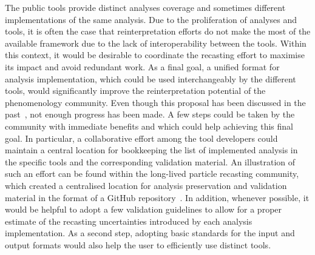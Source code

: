 \documentclass[11pt]{article}
\begin{document}
The public tools provide distinct analyses coverage and sometimes different implementations of the same analysis.
Due to the proliferation of analyses and tools, it is often the case that reinterpretation efforts do not make the most of the available framework due to the lack of interoperability between the tools.
Within this context, it would be desirable to coordinate the \gls{recasting} effort to maximise its impact and avoid redundant work. 
As a final goal, a unified format for analysis implementation, which could be used interchangeably by the different tools, would significantly improve the reinterpretation potential of the phenomenology community.
Even though this proposal has been discussed in the past~\cite{lukas_heinrich_2017_6362700}, not enough progress has been made.
A few steps could be taken by the community with immediate benefits and which could help achieving this final goal.
In particular, a collaborative effort among the tool developers could maintain a central location for bookkeeping the list of implemented analysis in the specific tools and the corresponding validation material.
An illustration of such an effort can be found within the 
long-lived particle \gls{recasting} community, which created a centralised location for \gls{analysis preservation} and validation material in the format of a GitHub repository~\cite{llpRepo}.
In addition, whenever possible, it would be helpful to adopt a few validation guidelines to allow for a proper estimate of the recasting uncertainties introduced by each analysis implementation.
As a second step, adopting basic standards for the input and output formats would also help the user to efficiently use distinct tools.
\end{document}
